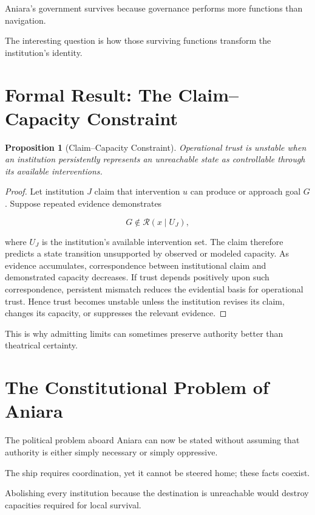 \documentclass[11pt,oneside]{book}
\newtheorem{proposition}[theorem]{Proposition}
\theoremstyle{definition}
\theoremstyle{remark}
\newcommand{\R}{\mathcal{R}}
\begin{document}
Aniara's government survives because governance performs more functions than navigation.

The interesting question is how those surviving functions transform the institution's identity.

\section{Formal Result: The Claim--Capacity Constraint}

\begin{proposition}[Claim--Capacity Constraint]
Operational trust is unstable when an institution persistently represents an unreachable state as controllable through its available interventions.
\end{proposition}

\begin{proof}
Let institution \(J\) claim that intervention \(u\) can produce or approach goal \(G\). Suppose repeated evidence demonstrates

\[
G\notin\R(x\mid U_J),
\]

where \(U_J\) is the institution's available intervention set. The claim therefore predicts a state transition unsupported by observed or modeled capacity. As evidence accumulates, correspondence between institutional claim and demonstrated capacity decreases. If trust depends positively upon such correspondence, persistent mismatch reduces the evidential basis for operational trust. Hence trust becomes unstable unless the institution revises its claim, changes its capacity, or suppresses the relevant evidence.
\end{proof}

This is why admitting limits can sometimes preserve authority better than theatrical certainty.

\section{The Constitutional Problem of Aniara}

The political problem aboard Aniara can now be stated without assuming that authority is either simply necessary or simply oppressive.

The ship requires coordination, yet it cannot be steered home; these facts coexist.

Abolishing every institution because the destination is unreachable would destroy capacities required for local survival.
\end{document}
